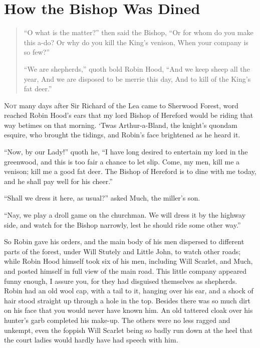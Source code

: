 \chapter{How the Bishop Was Dined}

\begin{quote}
“O what is the matter?” then said the Bishop,
“Or for whom do you make this a-do?
Or why do you kill the King’s venison,
When your company is so few?”

“We are shepherds,” quoth bold Robin Hood,
“And we keep sheep all the year,
And we are disposed to be merrie this day,
And to kill of the King’s fat deer.”
\end{quote}

\lettrine{N}{ot} many days after Sir Richard of the Lea came to Sherwood Forest, word
reached Robin Hood's ears that my lord Bishop of Hereford would be
riding that way betimes on that morning. `Twas Arthur-a-Bland, the
knight's quondam esquire, who brought the tidings, and Robin's face
brightened as he heard it.

``Now, by our Lady!'' quoth he, ``I have long desired to entertain my
lord in the greenwood, and this is too fair a chance to let slip. Come,
my men, kill me a venison; kill me a good fat deer. The Bishop of
Hereford is to dine with me today, and he shall pay well for his
cheer.''

``Shall we dress it here, as usual?'' asked Much, the miller's son.

``Nay, we play a droll game on the churchman. We will dress it by the
highway side, and watch for the Bishop narrowly, lest he should ride
some other way.''

So Robin gave his orders, and the main body of his men dispersed to
different parts of the forest, under Will Stutely and Little John, to
watch other roads; while Robin Hood himself took six of his men,
including Will Scarlet, and Much, and posted himself in full view of the
main road. This little company appeared funny enough, I assure you, for
they had disguised themselves as shepherds. Robin had an old wool cap,
with a tail to it, hanging over his ear, and a shock of hair stood
straight up through a hole in the top. Besides there was so much dirt on
his face that you would never have known him. An old tattered cloak over
his hunter's garb completed his make-up. The others were no less ragged
and unkempt, even the foppish Will Scarlet being so badly run down at
the heel that the court ladies would hardly have had speech with him.

